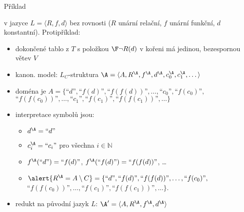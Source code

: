 \documentclass{beamer}
\begin{document}
\begin{frame}{Příklad}

    \pause
     v jazyce $L=\langle R,f,d \rangle$ bez rovnosti ($R$ unární relační, $f$ unární funkční, $d$ konstantní). Protipříklad: 

    \pause
    \begin{itemize}
        \item dokončené tablo z $T$ s položkou $\F\neg R(d)$ v kořeni má jedinou, bezespornou větev $V$\pause
        \item \alert{kanon. model:} $L_C$-struktura {$\A=\langle A,R^\A,f^\A,d^\A,c_0^\A,c_1^\A,\dots\rangle$}\pause
        \item doména je {$A=\{\text{``$d$''},\text{``$f(d)$''},\text{``$f(f(d))$''},\dots,\text{``$c_0$''},\text{``$f(c_0)$''},$ $\text{``$f(f(c_0))$''},\dots,\text{``$c_1$''},\text{``$f(c_1)$''},\text{``$f(f(c_1))$''},\dots\}$}\pause
        \item interpretace symbolů jsou:\pause
        \begin{itemize}
            \item $d^\A=\text{``$d$''}$\pause
            \item $c^\A_i=\text{``$c_i$''}$ pro všechna $i\in \mathbb N$\pause
            \item $f^\A(\text{``$d$''})=\text{``$f(d)$''}$, $f^\A(\text{``$f(d)$''})=\text{``$f(f(d))$''}$, \dots\pause
            \item $\alert{R^\A=A\setminus C}=\{\text{``$d$''},\text{``$f(d)$''},\text{``$f(f(d))$''},\dots,\text{``$f(c_0)$''},$ $\text{``$f(f(c_0))$''},\dots,\text{``$f(c_1)$''},\text{``$f(f(c_1))$''},\dots\}$.\pause
        \end{itemize}
        \item redukt na původní jazyk $L$: $\A'=\langle A, R^\A, f^\A, d^\A\rangle$
    \end{itemize}
        
\end{frame}
\end{document}
